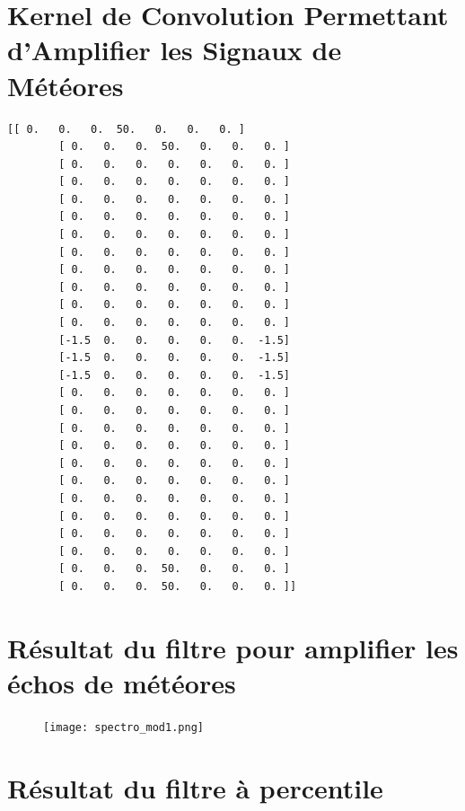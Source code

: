 \documentclass[11pt]{article}
\begin{document}
\newpage

\appendix

\section{Kernel de Convolution Permettant d'Amplifier les Signaux de Météores} \label{app:kernel}

\begin{lstlisting}[style=CStyle]
       [[ 0.   0.   0.  50.   0.   0.   0. ]
        [ 0.   0.   0.  50.   0.   0.   0. ]
        [ 0.   0.   0.   0.   0.   0.   0. ]
        [ 0.   0.   0.   0.   0.   0.   0. ]
        [ 0.   0.   0.   0.   0.   0.   0. ]
        [ 0.   0.   0.   0.   0.   0.   0. ]
        [ 0.   0.   0.   0.   0.   0.   0. ]
        [ 0.   0.   0.   0.   0.   0.   0. ]
        [ 0.   0.   0.   0.   0.   0.   0. ]
        [ 0.   0.   0.   0.   0.   0.   0. ]
        [ 0.   0.   0.   0.   0.   0.   0. ]
        [ 0.   0.   0.   0.   0.   0.   0. ]
        [-1.5  0.   0.   0.   0.   0.  -1.5]
        [-1.5  0.   0.   0.   0.   0.  -1.5]
        [-1.5  0.   0.   0.   0.   0.  -1.5]
        [ 0.   0.   0.   0.   0.   0.   0. ]
        [ 0.   0.   0.   0.   0.   0.   0. ]
        [ 0.   0.   0.   0.   0.   0.   0. ]
        [ 0.   0.   0.   0.   0.   0.   0. ]
        [ 0.   0.   0.   0.   0.   0.   0. ]
        [ 0.   0.   0.   0.   0.   0.   0. ]
        [ 0.   0.   0.   0.   0.   0.   0. ]
        [ 0.   0.   0.   0.   0.   0.   0. ]
        [ 0.   0.   0.   0.   0.   0.   0. ]
        [ 0.   0.   0.   0.   0.   0.   0. ]
        [ 0.   0.   0.  50.   0.   0.   0. ]
        [ 0.   0.   0.  50.   0.   0.   0. ]]
\end{lstlisting}

\newpage

\section{Résultat du filtre pour amplifier les échos de météores} \label{app:spectro-mod1}

\begin{figure}[h]
    \begin{center}
        \texttt{[image: spectro\_mod1.png]}
    \end{center}
\end{figure}

\section{Résultat du filtre à percentile} \label{app:spectro-mod2}
\end{document}
